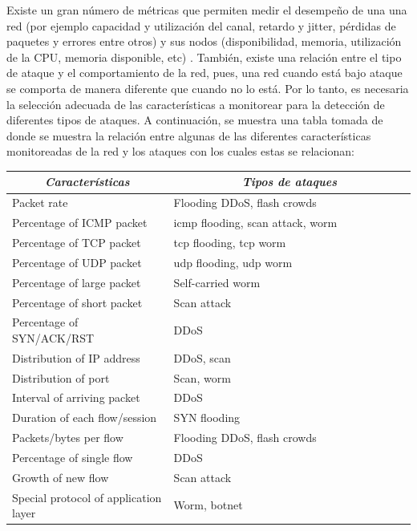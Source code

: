 \documentclass[12pt]{article}
\begin{document}
Existe un gran número de métricas que permiten medir el desempeño de una una red (por ejemplo capacidad y utilización del canal, retardo y jitter, pérdidas de paquetes y errores entre otros) y sus nodos (disponibilidad, memoria, utilización de la CPU, memoria disponible, etc) \citep{nsrc}. También, existe una relación entre el tipo de ataque y el comportamiento de la red, pues, una red cuando está bajo ataque se comporta de manera diferente que cuando no lo está. Por lo tanto, es necesaria la selección adecuada de las características a monitorear para la detección de diferentes tipos de ataques. A continuación, se muestra una tabla tomada de \citep{cipa} donde se muestra la relación entre algunas de las diferentes características monitoreadas de la red y los ataques con los cuales estas se relacionan:


\begin{table}[htbp]
\centering
\footnotesize
\begin{tabular}{|p{0.4\linewidth}|p{0.6\linewidth}|}
\hline
\multicolumn{1}{|c|}{\textit{\textbf{Características}}} & \multicolumn{1}{c|}{\textit{\textbf{Tipos de ataques}}} \tabularnewline \hline

Packet rate & 
Flooding DDoS, flash crowds  
\tabularnewline \hline

Percentage of ICMP packet & 
icmp flooding, scan attack, worm
\tabularnewline \hline

Percentage of TCP packet & 
tcp flooding, tcp worm
\tabularnewline \hline

Percentage of UDP packet & 
udp flooding, udp worm
\tabularnewline \hline

Percentage of large packet & 
Self-carried worm
\tabularnewline \hline

Percentage of short packet & 
Scan attack
\tabularnewline \hline

Percentage of SYN/ACK/RST & 
DDoS
\tabularnewline \hline

Distribution of IP address & 
DDoS, scan
\tabularnewline \hline

Distribution of port & 
Scan, worm
\tabularnewline \hline

Interval of arriving packet & 
DDoS
\tabularnewline \hline

Duration of each flow/session & 
SYN flooding
\tabularnewline \hline

Packets/bytes per flow & 
Flooding DDoS, flash crowds
\tabularnewline \hline

Percentage of single flow & 
DDoS
\tabularnewline \hline

Growth of new flow & 
Scan attack
\tabularnewline \hline

Special protocol of application layer & 
Worm, botnet
\tabularnewline \hline

\end{tabular}
\end{table}
\end{document}
